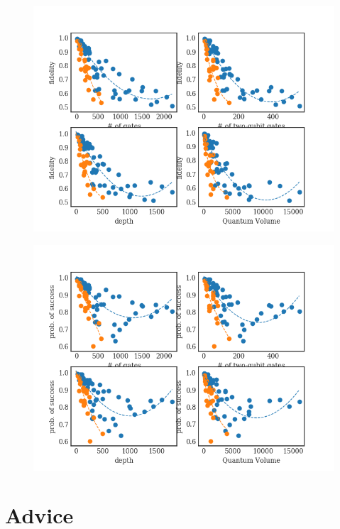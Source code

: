 \begin{figure}[htbp]
\centering
\includegraphics[width=\textwidth]{figures/f_metrics_correlation.png}
\caption{\label{fig:orga2c57b7}
}
\end{figure}

\begin{figure}[htbp]
\centering
\includegraphics[width=\textwidth]{figures/ps_metrics_correlation.png}
\caption{\label{fig:org13fcc01}
}
\end{figure}

\section{Advice}
\label{sec:org628b541}
